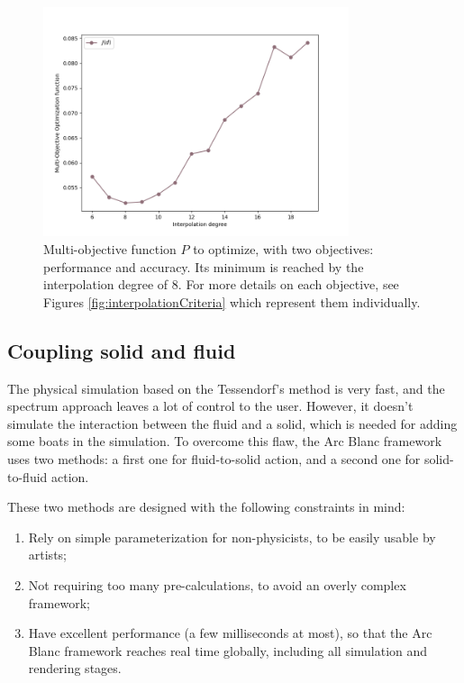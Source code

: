 \documentclass[final]{jcgt}
\def\framework{the Arc Blanc framework\xspace}
\begin{document}
\begin{figure}[ht]
	\centering
	\includegraphics[width=0.8\textwidth]{Figures/multiObjectiveAccuracy1Duration2.png}
	\caption{Multi-objective function $P$ to optimize, with two objectives: performance and accuracy.
		Its minimum is reached by the interpolation degree of $8$. For more details on each objective, see Figures \ref{fig:interpolationCriteria} which represent them individually.}
	\label{fig:multiObjectiveFunction}
\end{figure}


\subsection{Coupling solid and fluid}
\label{sec:couplingSolidAndFluid}
The physical simulation based on the Tessendorf's method is very fast, and the spectrum approach leaves a lot of control to the user.
However, it doesn't simulate the interaction between the fluid and a solid, which is needed for adding some boats in the simulation.
To overcome this flaw, \framework uses two methods: a first one for fluid-to-solid action, and a second one for solid-to-fluid action.

These two methods are designed with the following constraints in mind:
\begin{enumerate}
	\item \label{enum:simpleParam} Rely on simple parameterization for non-physicists, to be easily usable by artists;
	\item \label{enum:noPrecal} Not requiring too many pre-calculations, to avoid an overly complex framework;
	\item \label{enum:perf} Have excellent performance (a few milliseconds at most), so that \framework reaches real time globally, including all simulation and rendering stages.
\end{enumerate}
\end{document}
